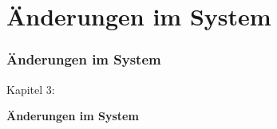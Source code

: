 %

\section{Änderungen im System}
\begin{frame}[fragile]
	\frametitle{Änderungen im System}

	\begin{center}\huge{Kapitel 3:}\end{center}
	\begin{center}\huge{\color{typo3darkgrey}\textbf{Änderungen im System}}\end{center}

\end{frame}


